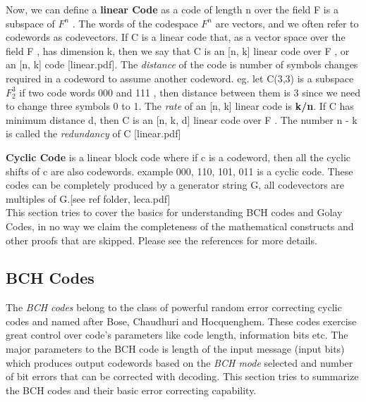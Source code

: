 Now, we can define a \textbf{linear Code} as a code of length n over the field F is a subspace of $F^n$ . The words of the codespace $F^n$ are vectors, and we often refer to codewords as codevectors.
If C is a linear code that, as a vector space over the field F , has dimension k,
then we say that C is an [n, k] linear code over F , or an [n, k] code [linear.pdf]. The \emph{distance} of the code is number of symbols changes required in a codeword to assume another codeword. eg. let C(3,3) is a subspace $F_2^3$ if two code words 000 and 111 , then distance between them is 3 since we need to change three symbols 0 to 1.
The \emph{rate} of an [n, k] linear code is \textbf{k/n}. If C has minimum distance d, then C is an [n, k, d] linear code over F .
The number n - k is called the \emph{redundancy} of C [linear.pdf]

\textbf{Cyclic Code} is a linear block code where if c is a codeword, then all the cyclic shifts of c are also codewords.
example {000, 110, 101, 011} is a cyclic code.
These codes can be completely produced by a generator string G, all codevectors are multiples of G.[see ref folder, leca.pdf]\\

This section tries to cover the basics for understanding BCH codes and Golay Codes, in no way we claim the completeness of the mathematical constructs and other proofs that are skipped. Please see the references for more details.\\

\subsection{BCH Codes}
\label{bch_section}
The \emph{BCH codes} belong to the class of powerful random error correcting cyclic codes and named after Bose, Chaudhuri and Hocquenghem. These codes exercise great control over code's parameters like code length, information bits etc. The major parameters to the BCH code is length of the input message (input bits) which produces output codewords based on the \emph{BCH mode} selected and number of bit errors that can be corrected with decoding. This section tries to summarize the BCH codes and
their basic error correcting capability.\\

